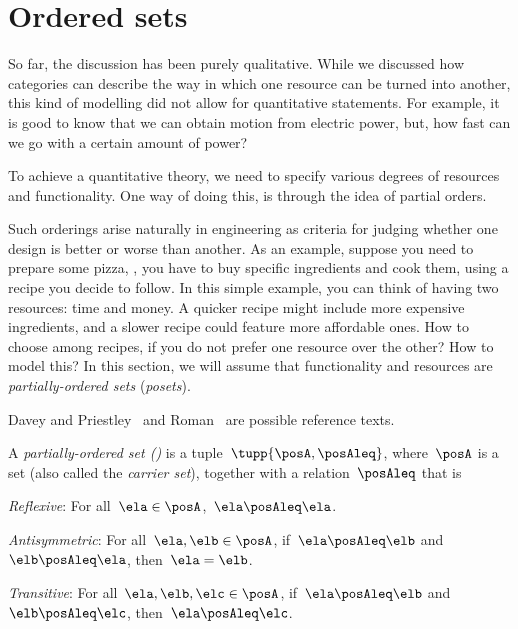 

\section{Ordered sets} \label{sec:tradeoffs-ordered-sets}


So far, the discussion has been purely qualitative. While we discussed how
categories can describe the way in which one resource can be turned into another,
this kind of modelling did not allow for quantitative statements. For example, it
is good to know that we can obtain motion from electric power, but, how fast can
we go with a certain amount of power?

To achieve a quantitative theory, we need to specify various degrees of resources and functionality.
One way of doing this, is through the idea of partial orders.


Such orderings arise naturally in engineering as criteria for judging whether one design is better or worse than another. As an example, suppose you need to prepare some pizza, \ie , you have to buy specific ingredients and cook them, using a recipe you decide to follow. In this simple example, you can think of having two resources: time and money. A quicker recipe might include more expensive ingredients, and a slower recipe could feature more affordable ones. How to choose among recipes, if you do not prefer one resource over the other? How to model this? In this section, we will assume that functionality and resources
are \emph{partially-ordered sets} (\emph{posets}).

Davey and Priestley~\cite{davey02}
and Roman~\cite{roman08} are possible reference texts.




\begin{definition}
  \label{def:poset}
  A \emph{partially-ordered set ()} is a tuple~$\tupp{\posA,\posAleq}$,
  where~$\posA$ is a set (also called the \emph{carrier set}), together with a
  relation~$\posAleq$   that is
  \begin{compactenum}
    \item \emph{Reflexive}: For all~$\ela\in \posA$,~$\ela \posAleq \ela$.
    \item \emph{Antisymmetric}: For all~$\ela,\elb\in \posA$, if~$\ela\posAleq \elb$ and~$\elb\posAleq \ela$, then~$\ela=\elb$.
    \item \emph{Transitive}: For all~$\ela,\elb,\elc\in \posA$, if~$\ela\posAleq \elb$ and~$\elb\posAleq \elc$, then~$\ela\posAleq \elc$.
  \end{compactenum}
\end{definition}

